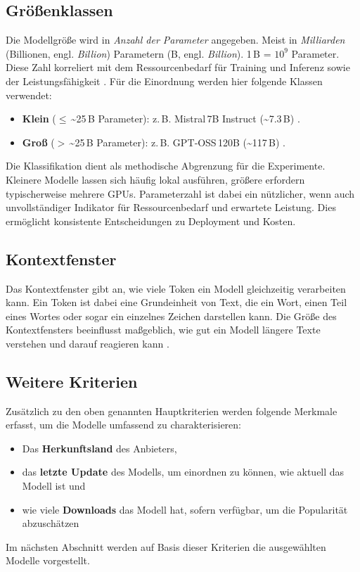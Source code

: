 \subsection*{Größenklassen}

Die Modellgröße wird in \emph{Anzahl der Parameter} angegeben. Meist in \emph{Milliarden} (Billionen, engl. \emph{Billion}) Parametern (B, engl. \emph{Billion}). 1\,B = \(10^9\) Parameter. Diese Zahl korreliert mit dem Ressourcenbedarf für Training und Inferenz sowie der Leistungsfähigkeit \cite{webdev-llm-sizes}. Für die Einordnung werden hier folgende Klassen verwendet:

\begin{itemize}
    \item \textbf{Klein} (\(\leq\)\,\textasciitilde{}25\,B Parameter): z.\,B. Mistral\,7B Instruct (\textasciitilde{}7.3\,B) \cite{HF_Mistral7B_2025}.
    \item \textbf{Groß} (\(>\)\,\textasciitilde{}25\,B Parameter): z.\,B. GPT‑OSS\,120B (\textasciitilde{}117\,B) \cite{OpenAI_GPTOSS_ModelCard_2025}.
\end{itemize}

Die Klassifikation dient als methodische Abgrenzung für die Experimente. Kleinere Modelle lassen sich häufig lokal ausführen, größere erfordern typischerweise mehrere GPUs. Parameterzahl ist dabei ein nützlicher, wenn auch unvollständiger Indikator für Ressourcenbedarf und erwartete Leistung. Dies ermöglicht konsistente Entscheidungen zu Deployment und Kosten.

\subsection*{Kontextfenster}

Das Kontextfenster gibt an, wie viele Token ein Modell gleichzeitig verarbeiten kann. Ein Token ist dabei eine Grundeinheit von Text, die ein Wort, einen Teil eines Wortes oder sogar ein einzelnes Zeichen darstellen kann. Die Größe des Kontextfensters beeinflusst maßgeblich, wie gut ein Modell längere Texte verstehen und darauf reagieren kann \cite{ibm-llm-context}.

\subsection*{Weitere Kriterien}

Zusätzlich zu den oben genannten Hauptkriterien werden folgende Merkmale erfasst, um die Modelle umfassend zu charakterisieren:

\begin{itemize}
    \item Das \textbf{Herkunftsland} des Anbieters,
    \item das \textbf{letzte Update} des Modells, um einordnen zu können, wie aktuell das Modell ist und
    \item wie viele \textbf{Downloads} das Modell hat, sofern verfügbar, um die Popularität abzuschätzen
\end{itemize}

Im nächsten Abschnitt werden auf Basis dieser Kriterien die ausgewählten Modelle vorgestellt.